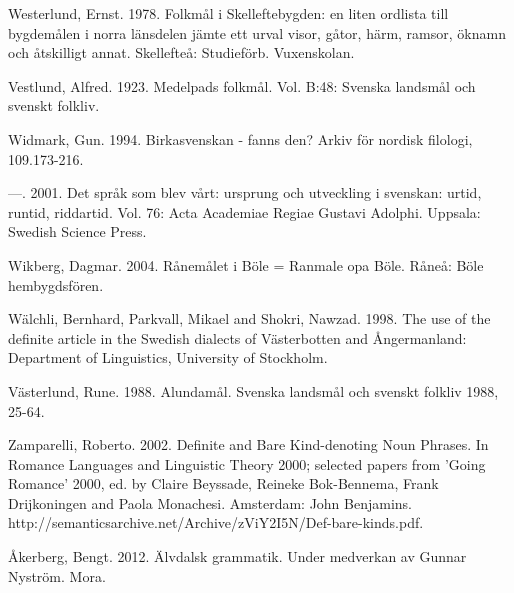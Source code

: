 \begin{styleBodytextC}
Westerlund, Ernst. 1978. Folkmål i Skelleftebygden: en liten ordlista till bygdemålen i norra länsdelen jämte ett urval visor, gåtor, härm, ramsor, öknamn och åtskilligt annat. Skellefteå: Studieförb. Vuxenskolan.

\end{styleBodytextC}

\begin{styleBodytextC}
Vestlund, Alfred. 1923. Medelpads folkmål. Vol. B:48: Svenska landsmål och svenskt folkliv.

\end{styleBodytextC}

\begin{styleBodytextC}
Widmark, Gun. 1994. Birkasvenskan - fanns den? Arkiv för nordisk filologi, 109.173-216.

\end{styleBodytextC}

\begin{styleBodytextC}
—. 2001. Det språk som blev vårt: ursprung och utveckling i svenskan: urtid, runtid, riddartid. Vol. 76: Acta Academiae Regiae Gustavi Adolphi. Uppsala: Swedish Science Press.

\end{styleBodytextC}

\begin{styleBodytextC}
Wikberg, Dagmar. 2004. Rånemålet i Böle = Ranmale opa Böle. Råneå: Böle hembygdsfören.

\end{styleBodytextC}

\begin{styleBodytextC}
Wälchli, Bernhard, Parkvall, Mikael and Shokri, Nawzad. 1998. The use of the definite article in the Swedish dialects of Västerbotten and Ångermanland: Department of Linguistics, University of Stockholm.

\end{styleBodytextC}

\begin{styleBodytextC}
Västerlund, Rune. 1988. Alundamål. Svenska landsmål och svenskt folkliv 1988, 25-64.

\end{styleBodytextC}

\begin{styleBodytextC}
Zamparelli, Roberto. 2002. Definite and Bare Kind-denoting Noun Phrases. In Romance Languages and Linguistic Theory 2000; selected papers from 'Going Romance' 2000, ed. by Claire Beyssade, Reineke Bok-Bennema, Frank Drijkoningen and Paola Monachesi. Amsterdam: John Benjamins. http://semanticsarchive.net/Archive/zViY2I5N/Def-bare-kinds.pdf.

\end{styleBodytextC}

\begin{styleBodytextC}
Åkerberg, Bengt. 2012. Älvdalsk grammatik. Under medverkan av Gunnar Nyström. Mora. 

\end{styleBodytextC}

 
